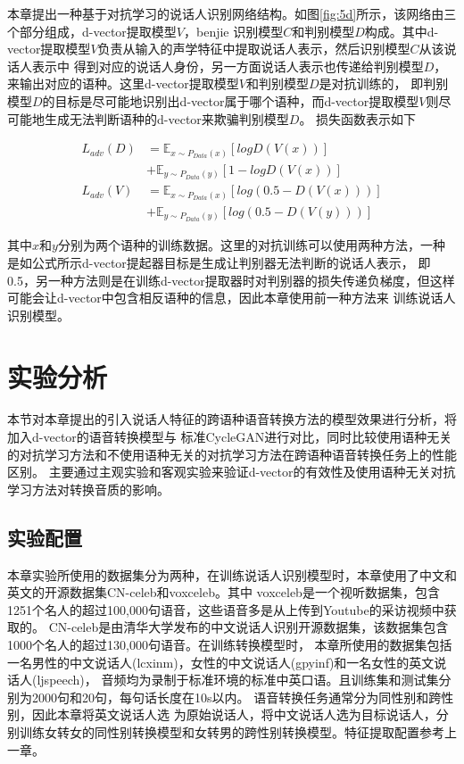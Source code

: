 本章提出一种基于对抗学习的说话人识别网络结构。如图\ref{fig:5d}所示，该网络由三个部分组成，d-vector提取模型$V$，benjie
识别模型$C$和判别模型$D$构成。其中d-vector提取模型$V$负责从输入的声学特征中提取说话人表示，然后识别模型$C$从该说话人表示中
得到对应的说话人身份，另一方面说话人表示也传递给判别模型$D$，来输出对应的语种。这里d-vector提取模型$V$和判别模型$D$是对抗训练的，
即判别模型$D$的目标是尽可能地识别出d-vector属于哪个语种，而d-vector提取模型$V$则尽可能地生成无法判断语种的d-vector来欺骗判别模型$D$。
损失函数表示如下


\begin{align}
    L_{adv}(D) & =\mathbb{E}_{x\sim P_{Data}(x)}\left[log D(V(x))\right] \\
               & +\mathbb{E}_{y\sim P_{Data}(y)}\left[1-log D(V(x))\right]\\
    L_{adv}(V) & =\mathbb{E}_{x\sim P_{Data}(x)}\left[log (0.5-D(V(x)))\right] \\
               & +\mathbb{E}_{y\sim P_{Data}(y)}\left[log (0.5-D(V(y)))\right]
\end{align}

其中$x$和$y$分别为两个语种的训练数据。这里的对抗训练可以使用两种方法，一种是如公式所示d-vector提起器目标是生成让判别器无法判断的说话人表示，
即0.5，另一种方法则是在训练d-vector提取器时对判别器的损失传递负梯度，但这样可能会让d-vector中包含相反语种的信息，因此本章使用前一种方法来
训练说话人识别模型。

\section{实验分析}
本节对本章提出的引入说话人特征的跨语种语音转换方法的模型效果进行分析，将加入d-vector的语音转换模型与
标准CycleGAN进行对比，同时比较使用语种无关的对抗学习方法和不使用语种无关的对抗学习方法在跨语种语音转换任务上的性能区别。
主要通过主观实验和客观实验来验证d-vector的有效性及使用语种无关对抗学习方法对转换音质的影响。
\subsection{实验配置}
本章实验所使用的数据集分为两种，在训练说话人识别模型时，本章使用了中文和英文的开源数据集CN-celeb和voxceleb。其中
voxceleb是一个视听数据集，包含1251个名人的超过100,000句语音，这些语音多是从上传到Youtube的采访视频中获取的。
CN-celeb是由清华大学发布的中文说话人识别开源数据集，该数据集包含1000个名人的超过130,000句语音。在训练转换模型时，
本章所使用的数据集包括一名男性的中文说话人(lcxinm)，女性的中文说话人(gpyinf)和一名女性的英文说话人(ljspeech)，
音频均为录制于标准环境的标准中英口语。且训练集和测试集分别为2000句和20句，每句话长度在10s以内。
语音转换任务通常分为同性别和跨性别，因此本章将英文说话人选
为原始说话人，将中文说话人选为目标说话人，分别训练女转女的同性别转换模型和女转男的跨性别转换模型。特征提取配置参考上一章。

